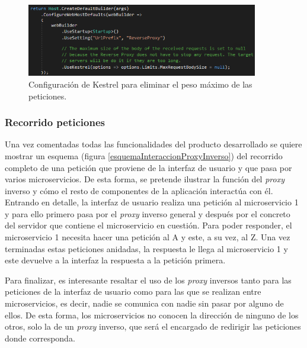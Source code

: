 \documentclass[11pt,spanish,listoffigures]{tfgetsinf}
\begin{document}
\begin{figure}[ht]
\centering
\includegraphics[width=0.9\textwidth]{imagenes/configuracionKestrel}
\caption{Configuración de Kestrel para eliminar el peso máximo de las peticiones.}
	\label{configuracionKestrel}
\end{figure}


			\subsubsection{Recorrido peticiones}

Una vez comentadas todas las funcionalidades del producto desarrollado se quiere mostrar un esquema (figura \ref{esquemaInteraccionProxyInverso}) del recorrido completo de una petición que proviene de la interfaz de usuario y que pasa por varios microservicios. De esta forma, se pretende ilustrar la función del \emph{proxy} inverso y cómo el resto de componentes de la aplicación interactúa con él. Entrando en detalle, la interfaz de usuario realiza una petición al microservicio 1 y para ello primero pasa por el \emph{proxy} inverso general y después por el concreto del servidor que contiene el microservicio en cuestión. Para poder responder, el microservicio 1 necesita hacer una petición al A y este, a su vez, al Z. Una vez terminadas estas peticiones anidadas, la respuesta le llega al microservicio 1 y este devuelve a la interfaz la respuesta a la petición primera.

Para finalizar, es interesante resaltar el uso de los \emph{proxy} inversos tanto para las peticiones de la interfaz de usuario como para las que se realizan entre microservicios, es decir, nadie se comunica con nadie sin pasar por alguno de ellos. De esta forma, los microservicios no conocen la dirección de ninguno de los otros, solo la de un \emph{proxy} inverso, que será el encargado de redirigir las peticiones donde corresponda.
\end{document}
